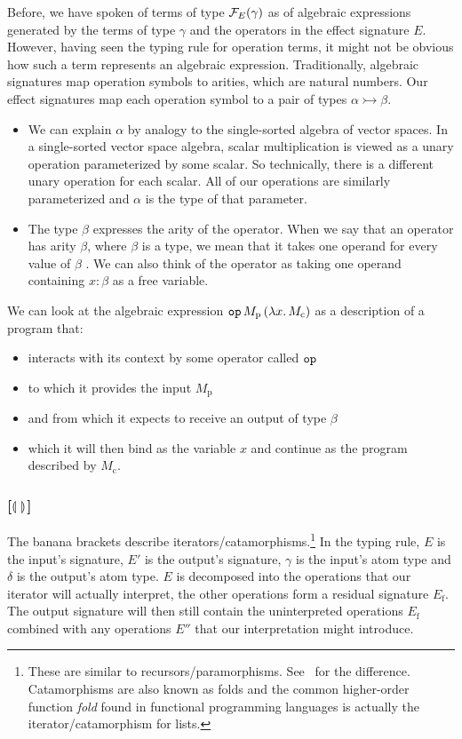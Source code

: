 \documentclass{llncs}
\begin{document}
Before, we have spoken of terms of type $\mathcal{F}_E(\gamma)$ as of algebraic
expressions generated by the terms of type $\gamma$ and the operators in
the effect signature $E$. However, having seen the typing rule for
operation terms, it might not be obvious how such a term represents an
algebraic expression. Traditionally, algebraic signatures map operation
symbols to arities, which are natural numbers. Our effect signatures map
each operation symbol to a pair of types $\alpha \rightarrowtail \beta$.
\begin{itemize}
\item We can explain $\alpha$ by analogy to the single-sorted algebra of
  vector spaces. In a single-sorted vector space algebra, scalar
  multiplication is viewed as a unary operation parameterized by some
  scalar. So technically, there is a different unary operation for each
  scalar. All of our operations are similarly parameterized and $\alpha$ is
  the type of that parameter.
\item The type $\beta$ expresses the arity of the operator. When we say
  that an operator has arity $\beta$, where $\beta$ is a type, we mean that
  it takes one operand for every value of $\beta$
  \cite{pretnar2010logic}. We can also think of the operator as taking one
  operand containing $x : \beta$ as a free variable.
\end{itemize}

We can look at the algebraic expression
$\mathtt{op}\,M_{\mathrm{p}}\,(\lambda x.\, M_{\mathrm{c}})$ as a description
of a program that:
\begin{itemize}
\item interacts with its context by some operator called $\mathtt{op}$
\item to which it provides the input $M_{\mathrm{p}}$
\item and from which it expects to receive an output of type $\beta$
\item which it will then bind as the variable $x$ and continue as the
  program described by $M_{\mathrm{c}}$.
\end{itemize}

\subsubsection*{[$\llparenthesis \,  \, \rrparenthesis$]}

The banana brackets describe iterators/catamorphisms.\footnote{These are
  similar to recursors/paramorphisms. See~\cite{meijer1991functional} for
  the difference. Catamorphisms are also known as folds and the common
  higher-order function \emph{fold} found in functional programming
  languages is actually the iterator/catamorphism for lists.} In the typing
rule, $E$ is the input's signature, $E'$ is the output's signature,
$\gamma$ is the input's atom type and $\delta$ is the output's atom
type. $E$ is decomposed into the operations that our iterator will actually
interpret, the other operations form a residual signature
$E_{\mathrm{f}}$. The output signature will then still contain the
uninterpreted operations $E_{\mathrm{f}}$ combined with any operations
$E''$ that our interpretation might introduce.
\end{document}
